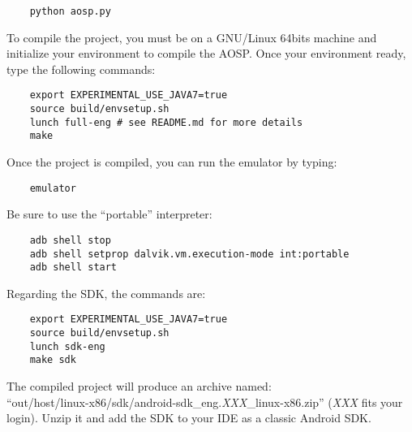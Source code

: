 \documentclass{sig-alternate}
\begin{document}
  {\scriptsize \begin{verbatim}
    python aosp.py
  \end{verbatim}}\vspace{-.8em}

  To compile the project, you must be on a GNU/Linux 64bits machine and initialize your environment to compile the AOSP\cite{android-sources}.
  Once your environment ready, type the following commands:
 
  {\scriptsize \begin{verbatim}
    export EXPERIMENTAL_USE_JAVA7=true
    source build/envsetup.sh
    lunch full-eng # see README.md for more details
    make
  \end{verbatim}}\vspace{-.8em}

  Once the project is compiled, you can run the emulator by typing:

  {\scriptsize \begin{verbatim}
    emulator
  \end{verbatim}}\vspace{-.8em}

  Be sure to use the ``portable'' interpreter:

  {\scriptsize \begin{verbatim}
    adb shell stop
    adb shell setprop dalvik.vm.execution-mode int:portable
    adb shell start
  \end{verbatim}}\vspace{-.8em}

  Regarding the SDK, the commands are:

  {\scriptsize \begin{verbatim}
    export EXPERIMENTAL_USE_JAVA7=true
    source build/envsetup.sh
    lunch sdk-eng
    make sdk
  \end{verbatim}}\vspace{-.8em}

  The compiled project will produce an archive named:\\
  ``out/host/linux-x86/sdk/android-sdk\_eng.{\it XXX}\_linux-x86.zip''
  ({\it XXX} fits your login).
  Unzip it and add the SDK to your IDE as a classic Android SDK.
\end{document}
